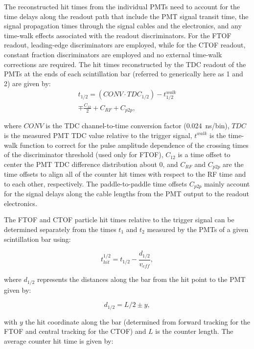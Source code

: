 The reconstructed hit times from the individual PMTs need to account for the time delays along the readout
path that include the PMT signal transit time, the signal propagation times through the signal cables and the
electronics, and any time-walk effects associated with the readout discriminators. For the FTOF readout,
leading-edge discriminators are employed, while for the CTOF readout, constant fraction discriminators are
employed and no external time-walk corrections are required. The hit times reconstructed by the TDC readout
of the PMTs at the ends of each scintillation bar (referred to generically here as 1 and 2) are given by:
\begin{multline}
t_{1/2} = (CONV \cdot TDC_{1/2}) - t_{1/2}^{walk} \\ \mp \frac{C_{12}}{2} + C_{RF} + C_{p2p},
\end{multline}

\noindent
where $CONV$ is the TDC channel-to-time conversion factor (0.024~ns/bin), $TDC$ is the measured PMT TDC
value relative to the trigger signal, $t^{walk}$ is the time-walk function to correct for the pulse amplitude
dependence of the crossing times of the discriminator threshold (used only for FTOF), $C_{12}$ is a time offset
to center the PMT TDC difference distribution about 0, and $C_{RF}$ and $C_{p2p}$ are the time offsets to
align all of the counter hit times with respect to the RF time and to each other, respectively. The paddle-to-paddle
time offsets $C_{p2p}$ mainly account for the signal delays along the cable lengths from the PMT output to the
readout electronics.

The FTOF and CTOF particle hit times relative to the trigger signal can be determined separately from the times
$t_1$ and $t_2$ measured by the PMTs of a given scintillation bar using:

\begin{equation}
\label{thit-1}
t_{hit}^{1/2} = t_{1/2} - \frac{d_{1/2}}{v_{eff}},
\end{equation}

\noindent
where $d_{1/2}$ represents the distances along the bar from the hit point to the PMT given by:

\begin{equation}
d_{1/2}= L/2 \pm y,
\end{equation}

\noindent
with $y$ the hit coordinate along the bar (determined from forward tracking for the FTOF and central tracking
for the CTOF) and $L$ is the counter length. The average counter hit time is given by:

